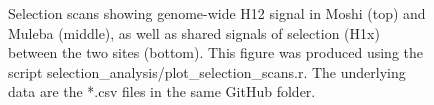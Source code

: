 \documentclass[a4paper,12pt]{article}
\begin{document}
\begin{figure}[h]
	\begin{center}
		\vskip 0.4cm
		\vskip 0.4cm
	\end{center}
	\caption{\footnotesize Selection scans showing genome-wide H12 signal in Moshi (top) and Muleba (middle), as well as shared signals of selection (H1x) between the two sites (bottom). This figure was produced using the script selection\_analysis/plot\_selection\_scans.r. The underlying data are the *.csv files in the same GitHub folder.}
	\label{FigS4}
\end{figure}


\clearpage
\end{document}
